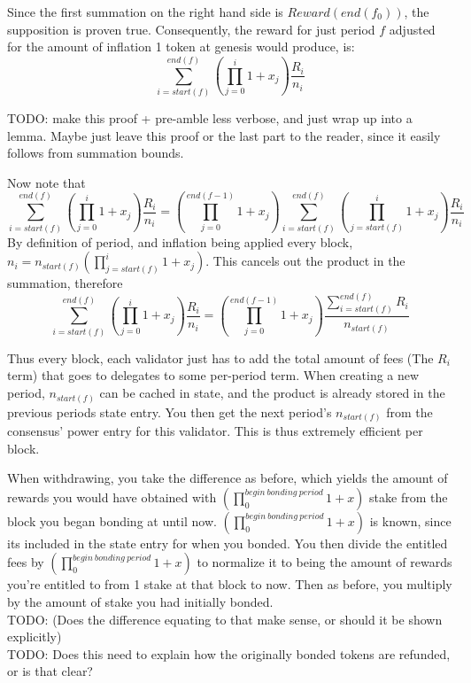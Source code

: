\documentclass[]{article}
\begin{document}
Since the first summation on the right hand side is $Reward(end(f_0))$, the supposition is proven true.
Consequently, the reward for just period $f$ adjusted for the amount of inflation 1 token at genesis would produce, is:
$$\sum_{i = start(f)}^{end(f)}\left(\prod_{j = 0}^{i} 1 + x_j \right) \frac{R_i}{n_i}$$

TODO: make this proof + pre-amble less verbose, and just wrap up into a lemma. 
Maybe just leave this proof or the last part to the reader, since it easily follows from summation bounds.

Now note that 
$$\sum_{i = start(f)}^{end(f)}\left(\prod_{j = 0}^{i} 1 + x_j \right) \frac{R_i}{n_i} = \left(\prod_{j = 0}^{end(f - 1)} 1 + x_j \right)\sum_{i = start(f)}^{end(f)}\left(\prod_{j = start(f)}^{i} 1 + x_j \right) \frac{R_i}{n_i}$$
By definition of period, and inflation being applied every block, \\
$n_i = n_{start(f)}\left(\prod_{j = start(f)}^{i} 1 + x_j \right)$. This cancels out the product in the summation, therefore
$$\sum_{i = start(f)}^{end(f)}\left(\prod_{j = 0}^{i} 1 + x_j \right) \frac{R_i}{n_i} = \left(\prod_{j = 0}^{end(f - 1)} 1 + x_j \right)\frac{\sum_{i = start(f)}^{end(f)}R_i}{n_{start(f)}}$$

Thus every block, each validator just has to add the total amount of fees (The $R_i$ term) that goes to delegates to some per-period term.
When creating a new period, $n_{start(f)}$ can be cached in state, and the product is already stored in the previous periods state entry.
You then get the next period's $n_{start(f)}$ from the consensus' power entry for this validator. 
This is thus extremely efficient per block.

When withdrawing, you take the difference as before,
which yields the amount of rewards you would have obtained with $(\prod_0^{begin\ bonding\ period}1 + x)$ stake from the block you began bonding at until now.
$(\prod_0^{begin\ bonding\ period}1 + x)$ is known, since its included in the state entry for when you bonded.
You then divide the entitled fees by $(\prod_0^{begin\ bonding\ period}1 + x)$ to normalize it to being the amount of rewards you're entitled to from 1 stake at that block to now.
Then as before, you multiply by the amount of stake you had initially bonded.
\\TODO: (Does the difference equating to that make sense, or should it be shown explicitly)
\\TODO: Does this need to explain how the originally bonded tokens are refunded, or is that clear?
\end{document}
